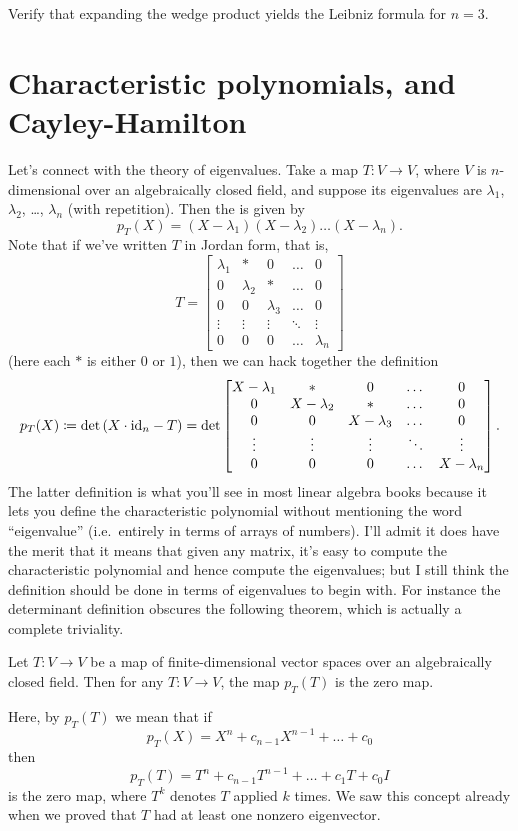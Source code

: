 \begin{exercise}
	Verify that expanding the wedge product
	yields the Leibniz formula for $n=3$.
\end{exercise}

\section{Characteristic polynomials, and Cayley-Hamilton}
Let's connect with the theory of eigenvalues.
Take a map $T \colon V \to V$, where $V$ is $n$-dimensional
over an algebraically closed field,
and suppose its eigenvalues
are $\lambda_1$, $\lambda_2$, \dots, $\lambda_n$ (with repetition).
Then the  is given by
\[
	p_T(X) = (X-\lambda_1)(X-\lambda_2) \dots (X-\lambda_n).
\]
Note that if we've written $T$ in Jordan form, that is,
\[
	T = \begin{bmatrix}
		\lambda_1 & \ast & 0 & \dots & 0 \\
		0 & \lambda_2 & \ast & \dots & 0 \\
		0 & 0 & \lambda_3 & \dots & 0 \\
		\vdots & \vdots & \vdots & \ddots & \vdots \\
		0 & 0 & 0 & \dots & \lambda_n
	\end{bmatrix}
\]
(here each $\ast$ is either $0$ or $1$),
then we can hack together the definition
\[
	p_T(X) \coloneqq
	\det \left( X \cdot \mathrm{id}_n - T \right)
	= \det \begin{bmatrix}
		X - \lambda_1 & \ast & 0 & \dots & 0 \\
		0 & X - \lambda_2 & \ast & \dots & 0 \\
		0 & 0 & X - \lambda_3 & \dots & 0 \\
		\vdots & \vdots & \vdots & \ddots & \vdots \\
		0 & 0 & 0 & \dots & X - \lambda_n
	\end{bmatrix}.
\]
The latter definition is what you'll see in most
linear algebra books because it lets you define the characteristic polynomial
without mentioning the word ``eigenvalue''
(i.e.\ entirely in terms of arrays of numbers).
I'll admit it does have the merit that it means that given any matrix,
it's easy to compute the characteristic polynomial and hence
compute the eigenvalues;
but I still think the definition should be done in terms of
eigenvalues to begin with.
For instance the determinant definition obscures the following theorem,
which is actually a complete triviality.
\begin{theorem}
	Let $T \colon V \to V$ be a map of finite-dimensional
	vector spaces over an algebraically closed field.
	Then for any $T \colon V \to V$,
	the map $p_T(T)$ is the zero map.
\end{theorem}
Here, by $p_T(T)$ we mean that if
\[ p_T(X) = X^n + c_{n-1} X^{n-1} + \dots + c_0 \]
then \[ p_T(T) = T^n + c_{n-1} T^{n-1} + \dots + c_1 T +  c_0 I \]
is the zero map,
where $T^k$ denotes $T$ applied $k$ times.
We saw this concept already when we proved
that $T$ had at least one nonzero eigenvector.

